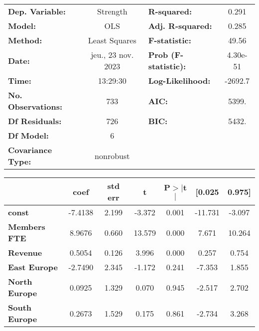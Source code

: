 \documentclass[ 11pt]{article}
\begin{document}
\begin{center}
\begin{tabular}{lclc}
\toprule
\textbf{Dep. Variable:}    &      Strength      & \textbf{  R-squared:         } &     0.291   \\
\textbf{Model:}            &        OLS         & \textbf{  Adj. R-squared:    } &     0.285   \\
\textbf{Method:}           &   Least Squares    & \textbf{  F-statistic:       } &     49.56   \\
\textbf{Date:}             & jeu., 23 nov. 2023 & \textbf{  Prob (F-statistic):} &  4.30e-51   \\
\textbf{Time:}             &      13:29:30      & \textbf{  Log-Likelihood:    } &   -2692.7   \\
\textbf{No. Observations:} &          733       & \textbf{  AIC:               } &     5399.   \\
\textbf{Df Residuals:}     &          726       & \textbf{  BIC:               } &     5432.   \\
\textbf{Df Model:}         &            6       & \textbf{                     } &             \\
\textbf{Covariance Type:}  &     nonrobust      & \textbf{                     } &             \\
\bottomrule
\end{tabular}
\begin{tabular}{lcccccc}
                      & \textbf{coef} & \textbf{std err} & \textbf{t} & \textbf{P$> |$t$|$} & \textbf{[0.025} & \textbf{0.975]}  \\
\midrule
\textbf{const}        &      -7.4138  &        2.199     &    -3.372  &         0.001        &      -11.731    &       -3.097     \\
\textbf{Members FTE}  &       8.9676  &        0.660     &    13.579  &         0.000        &        7.671    &       10.264     \\
\textbf{Revenue}      &       0.5054  &        0.126     &     3.996  &         0.000        &        0.257    &        0.754     \\
\textbf{East Europe}  &      -2.7490  &        2.345     &    -1.172  &         0.241        &       -7.353    &        1.855     \\
\textbf{North Europe} &       0.0925  &        1.329     &     0.070  &         0.945        &       -2.517    &        2.702     \\
\textbf{South Europe} &       0.2673  &        1.529     &     0.175  &         0.861        &       -2.734    &        3.268     \\

\end{tabular}
\end{center}
\end{document}
